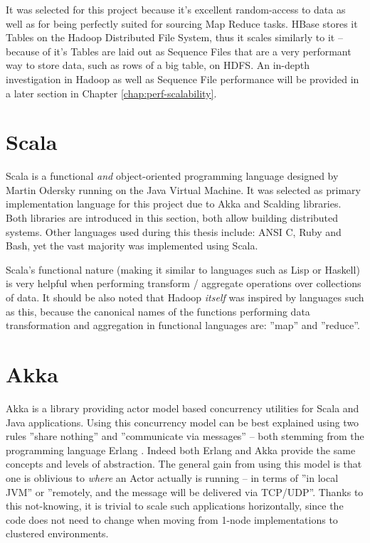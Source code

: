 It was selected for this project because it's excellent random-access to data as well as for being perfectly suited for sourcing Map Reduce tasks. HBase stores it Tables on the Hadoop Distributed File System, thus it scales similarly to it -- because of it's Tables are laid out as Sequence Files that are a very performant way to store data, such as rows of a big table, on HDFS. An in-depth investigation in Hadoop as well as Sequence File performance will be provided in a later section in Chapter \ref{chap:perf-scalability}.

\section{Scala}
\label{sec:scala}
Scala is a functional \textit{and} object-oriented programming language designed by Martin Odersky \cite{scala} running on the Java Virtual Machine. It was selected as primary implementation language for this project due to Akka and Scalding libraries. Both libraries are introduced in this section, both allow building distributed systems. Other languages used during this thesis include: ANSI C, Ruby and Bash, yet the vast majority was implemented using Scala.

Scala's functional nature (making it similar to languages such as Lisp or Haskell) is very helpful when performing transform / aggregate operations over collections of data. It should be also noted that Hadoop \textit{itself} was inspired by languages such as this, because the canonical names of the functions performing data transformation and aggregation in functional languages are: ''map'' and ''reduce''.

\section{Akka}
\label{sec:akka}

Akka is a library providing actor model \cite{actor-model} based concurrency utilities for Scala and Java applications. 
Using this concurrency model can be best explained using two rules ''share nothing'' and ''communicate via messages'' -- both stemming from the programming language Erlang \cite{erlang}. Indeed both Erlang and Akka provide the same concepts and levels of abstraction. The general gain from using this model is that one is oblivious to \textit{where} an Actor  actually is running -- in terms of ''in local JVM'' or ''remotely, and the message will be delivered via TCP/UDP''. Thanks to this not-knowing, it is trivial to scale such applications horizontally, since the code does not need to change when moving from 1-node implementations to clustered environments.

